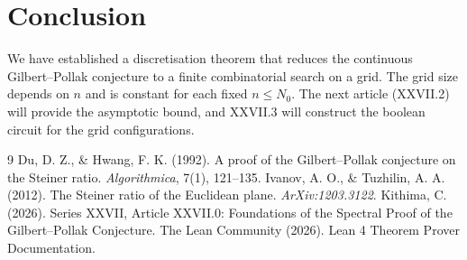 \documentclass[11pt,a4paper]{article}
\begin{document}
\section{Conclusion}
We have established a discretisation theorem that reduces the continuous Gilbert–Pollak conjecture to a finite combinatorial search on a grid. The grid size depends on \(n\) and is constant for each fixed \(n \le N_0\). The next article (XXVII.2) will provide the asymptotic bound, and XXVII.3 will construct the boolean circuit for the grid configurations.


\begin{thebibliography}{9}
  Du, D. Z., \& Hwang, F. K. (1992). A proof of the Gilbert–Pollak conjecture on the Steiner ratio. \emph{Algorithmica}, 7(1), 121–135.
  Ivanov, A. O., \& Tuzhilin, A. A. (2012). The Steiner ratio of the Euclidean plane. \emph{ArXiv:1203.3122}.
  Kithima, C. (2026). Series XXVII, Article XXVII.0: Foundations of the Spectral Proof of the Gilbert–Pollak Conjecture.
  The Lean Community (2026). Lean 4 Theorem Prover Documentation.
\end{thebibliography}
\end{document}
